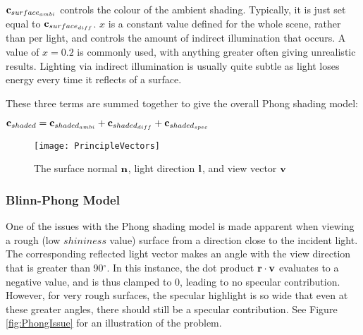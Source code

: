 \begin{math}\mathbf{c}_{surface_{ambi}}\end{math} controls the colour of the ambient shading. Typically, it is just set equal to \begin{math}\mathbf{c}_{surface_{diff}}\end{math}. \begin{math}x\end{math} is a constant value defined for the whole scene, rather than per light, and controls the amount of indirect illumination that occurs. A value of \begin{math}x = 0.2\end{math} is commonly used, with anything greater often giving unrealistic results. Lighting via indirect illumination is usually quite subtle as light loses energy every time it reflects of a surface.

These three terms are summed together to give the overall Phong shading model:

\begin{center}
	\begin{math}\mathbf{c}_{shaded} = \mathbf{c}_{shaded_{ambi}} + \mathbf{c}_{shaded_{diff}} + \mathbf{c}_{shaded_{spec}}\end{math}
\end{center}

\begin{figure}[h]
	\centering
	\texttt{[image: PrincipleVectors]}
	\caption{The surface normal \begin{math}\mathbf{n}\end{math}, light direction \begin{math}\mathbf{l}\end{math}, and view vector \begin{math}\mathbf{v}\end{math}~\cite{RTR4}}
	\label{fig:PrincipleVectors}
\end{figure}

\subsubsection{Blinn-Phong Model}

One of the issues with the Phong shading model is made apparent when viewing a rough (low \begin{math}shininess\end{math} value) surface from a direction close to the incident light. The corresponding reflected light vector makes an angle with the view direction that is greater than 90$^{\circ}$. In this instance, the dot product \begin{math}\mathbf{r}\cdot\mathbf{v}\end{math} evaluates to a negative value, and is thus clamped to 0, leading to no specular contribution. However, for very rough surfaces, the specular highlight is so wide that even at these greater angles, there should still be a specular contribution. See Figure \ref{fig:PhongIssue} for an illustration of the problem.


